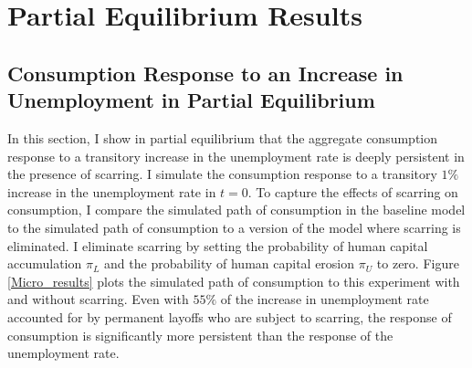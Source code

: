 
\section{Partial Equilibrium Results}




\subsection{Consumption Response to an Increase in Unemployment in Partial Equilibrium}

In this section, I show in partial equilibrium that the aggregate consumption response to a transitory increase in the unemployment rate is deeply persistent in the presence of scarring. I simulate the consumption response to a transitory $1\%$ increase in the unemployment rate in $t=0$. To capture the effects of scarring on consumption, I compare the simulated path of consumption in the baseline model to the simulated path of consumption to a version of the model where scarring is eliminated. I eliminate scarring by setting the probability of human capital accumulation $\pi_{L}$ and the probability of human capital erosion $\pi_{U}$ to zero. Figure \ref{Micro_results} plots the simulated path of consumption to this experiment with and without scarring. Even with $55\%$ of the increase in unemployment rate accounted for by permanent layoffs who are subject to scarring, the response of consumption is significantly more persistent than the response of the unemployment rate. 



